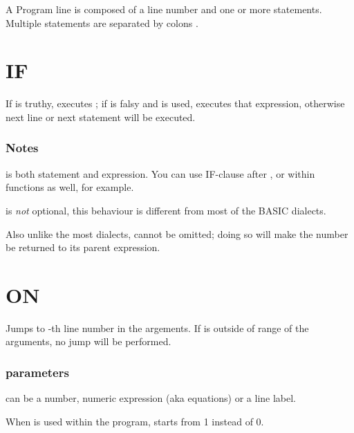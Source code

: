 \label{statements}

A Program line is composed of a line number and one or more statements. Multiple statements are separated by colons \code{:}.

\section{IF}


If  is truthy, executes ; if  is falsy and  is used, executes that expression, otherwise next line or next statement will be executed.

\subsubsection*{Notes}

\begin{itemlist}
\item {} is both statement and expression. You can use IF-clause after , or within functions as well, for example.
\item {} is \emph{not} optional, this behaviour is different from most of the BASIC dialects.
\item Also unlike the most dialects,  cannot be omitted; doing so will make the number be returned to its parent expression.
\end{itemlist}

\section{ON}


Jumps to -th line number in the argements. If  is outside of range of the arguments, no jump will be performed.

\subsubsection*{parameters}

\begin{itemlist}
\item {} can be a number, numeric expression (aka equations) or a line label.
\item When  is used within the program,  starts from 1 instead of 0.
\end{itemlist}

